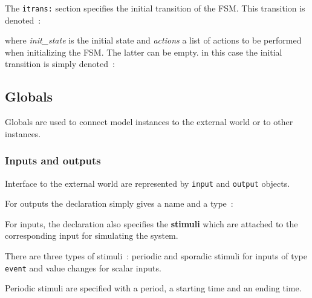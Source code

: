 The \verb|itrans:| section specifies the initial transition of the FSM. This transition is denoted~:

\begin{center}
\end{center}

where \emph{init\_state} is the initial state and \emph{actions} a list of actions to be performed
when initializing the FSM. The latter can be empty. in this case the initial transition is simply
denoted~:

\begin{center}
\end{center}

\subsection{Globals}
\label{sec:globals}

Globals are used to connect model instances to the external world or to other instances.

\subsubsection*{Inputs and outputs}
\label{sec:inputs-outputs}

Interface to the external world are represented by \verb|input| and \verb|output| objects.

\step For outputs the declaration simply gives a name and a type~:

\begin{center}
\end{center}

\step For inputs, the declaration also specifies the \textbf{stimuli} which are attached to the
corresponding input for simulating the system.
\begin{center}
\end{center}

There are three types of stimuli~:
periodic and
sporadic stimuli for inputs of type \verb|event| and value changes for scalar inputs.

\medskip
Periodic stimuli are specified with a period, a starting time and an ending time.

\begin{center}
\end{center}

